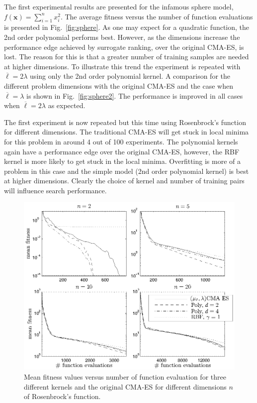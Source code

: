 \documentclass[10pt]{llncs}
\renewcommand{\vec}[1]{{\mbox{\boldmath$#1$}}}
\renewcommand{\vec}[1]{{\mathbf #1}}
\begin{document}
The first experimental results are presented for the infamous
sphere model, $f(\vec{x}) = \sum_{i=1}^nx_i^2$. The average
fitness versus the number of function evaluations is presented
in Fig.~\ref{fig:sphere}. As one may expect for a quadratic
function, the 2nd order polynomial performs best. However, as
the dimensions increase the performance edge achieved by
surrogate ranking, over the original CMA-ES, is lost. The reason
for this is that a greater number of training samples are needed
at higher dimensions. To illustrate this trend the experiment is
repeated with $\overline{\ell} = 2\lambda$ using only the 2nd
order polynomial kernel. A comparison for the different problem
dimensions with the original CMA-ES and the case when
$\overline{\ell}=\lambda$ is shown in Fig.~\ref{fig:sphere2}.
The performance is improved in all cases when
$\overline{\ell}=2\lambda$ as expected.




The first experiment is now repeated but this time using
Rosenbrock's function for different dimensions. The traditional
CMA-ES will get stuck in local minima for this problem in around
4 out of 100 experiments. The polynomial kernels again have a
performance edge over the original CMA-ES, however, the RBF
kernel is more likely to get stuck in the local minima.
Overfitting is more of a problem in this case and the simple
model (2nd order polynomial kernel) is best at higher
dimensions. Clearly the choice of kernel and number of training
pairs will influence search performance.

\begin{figure}[t!]
\centering
\includegraphics[width=0.8\columnwidth]{figs/rosen_1.eps}
\caption{Mean fitness values versus number of function
  evaluation for three different kernels and the original CMA-ES for
  different dimensions $n$ of Rosenbrock's function.}
\label{fig:rosen}
\end{figure}
\end{document}
